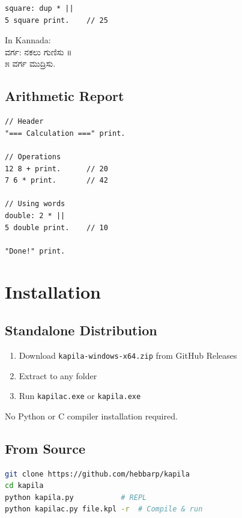 \documentclass[11pt,a4paper]{report}
\newcommand{\kannada}[1]{{\kannadafont #1}}
\begin{document}
\begin{verbatim}
square: dup * ||
5 square print.    // 25
\end{verbatim}

In Kannada:\\
\kannada{ವರ್ಗ: ನಕಲು ಗುಣಿಸು ॥}\\
\kannada{೫ ವರ್ಗ ಮುದ್ರಿಸು.}

\section{Arithmetic Report}

\begin{verbatim}
// Header
"=== Calculation ===" print.

// Operations
12 8 + print.      // 20
7 6 * print.       // 42

// Using words
double: 2 * ||
5 double print.    // 10

"Done!" print.
\end{verbatim}

\appendix
\chapter{Installation}

\section{Standalone Distribution}

\begin{enumerate}
    \item Download \texttt{kapila-windows-x64.zip} from GitHub Releases
    \item Extract to any folder
    \item Run \texttt{kapilac.exe} or \texttt{kapila.exe}
\end{enumerate}

No Python or C compiler installation required.

\section{From Source}

\begin{lstlisting}[language=bash]
git clone https://github.com/hebbarp/kapila
cd kapila
python kapila.py           # REPL
python kapilac.py file.kpl -r  # Compile & run
\end{lstlisting}
\end{document}
